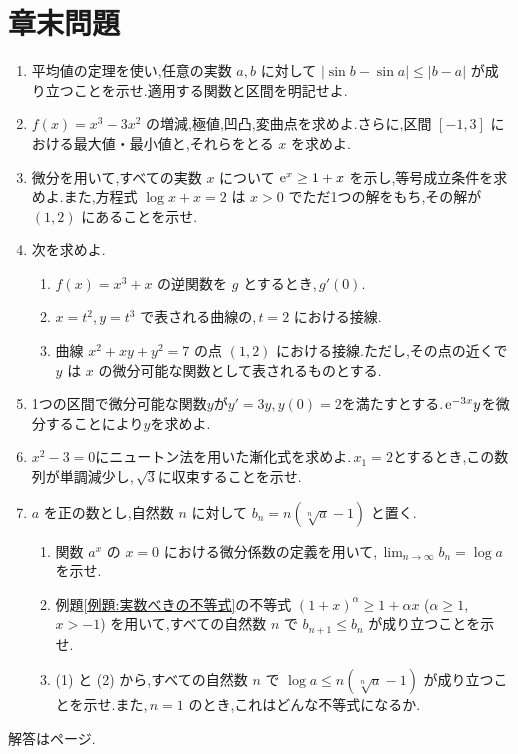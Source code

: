\section*{章末問題}
\begin{enumerate}[label=\textbf{\thechapter.\arabic*},leftmargin=*]

 \item\label{問:平均値評価} 平均値の定理を使い,任意の実数 $a,b$ に対して $|\sin b-\sin a|\le|b-a|$ が成り立つことを示せ.適用する関数と区間を明記せよ.
 \item\label{問:三次関数グラフ} $f(x)=x^3-3x^2$ の増減,極値,凹凸,変曲点を求めよ.さらに,区間 $[-1,3]$ における最大値・最小値と,それらをとる $x$ を求めよ.
 \item\label{問:指数不等式方程式} 微分を用いて,すべての実数 $x$ について $\mathrm{e}^x\ge1+x$ を示し,等号成立条件を求めよ.また,方程式 $\log x+x=2$ は $x>0$ でただ1つの解をもち,その解が $(1,2)$ にあることを示せ.
 \item\label{問:逆媒介陰} 次を求めよ.
 \begin{enumerate}[label=(\arabic*),leftmargin=*]
  \item $f(x)=x^3+x$ の逆関数を $g$ とするとき,\,$g'(0)$.
  \item $x=t^2$,\,$y=t^3$ で表される曲線の,\,$t=2$ における接線.
  \item 曲線 $x^2+xy+y^2=7$ の点 $(1,2)$ における接線.ただし,その点の近くで $y$ は $x$ の微分可能な関数として表されるものとする.
 \end{enumerate}

 \item\label{問:微分方程式初期値} 1つの区間で微分可能な関数$y$が$y'=3y$,\,$y(0)=2$を満たすとする.\,$\mathrm{e}^{-3x}y$を微分することにより$y$を求めよ.

 \item\label{問:三平方根ニュートン} $x^2-3=0$にニュートン法を用いた漸化式を求めよ.\,$x_1=2$とするとき,この数列が単調減少し,\,$\sqrt3$に収束することを示せ.

 \item\label{問:n乗根と対数} $a$ を正の数とし,自然数 $n$ に対して $b_n=n\left(\sqrt[n]{a}-1\right)$ と置く.
 \begin{enumerate}[label=(\arabic*),leftmargin=*]
  \item 関数 $a^x$ の $x=0$ における微分係数の定義を用いて,\,$\lim_{n\to\infty}b_n=\log a$ を示せ.
  \item 例題\ref{例題:実数べきの不等式}の不等式 $(1+x)^\alpha\ge1+\alpha x$ ($\alpha\ge1$,\,$x>-1$) を用いて,すべての自然数 $n$ で $b_{n+1}\le b_n$ が成り立つことを示せ.
  \item (1) と (2) から,すべての自然数 $n$ で $\log a\le n\left(\sqrt[n]{a}-1\right)$ が成り立つことを示せ.また,\,$n=1$ のとき,これはどんな不等式になるか.
 \end{enumerate}
\end{enumerate}
\smallskip\noindent 解答は\pageref{解答:第3章}ページ.
